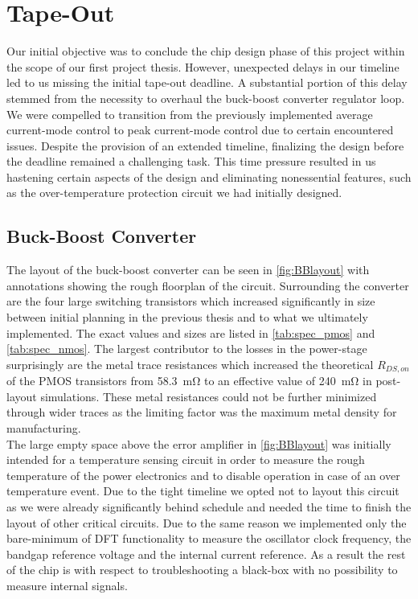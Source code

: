 \section{Tape-Out}
\label{sec:tapout}
Our initial objective was to conclude the chip design phase of this project within the scope of our first project thesis. However, unexpected delays in our timeline led to us missing the initial tape-out deadline. A substantial portion of this delay stemmed from the necessity to overhaul the buck-boost converter regulator loop. We were compelled to transition from the previously implemented average current-mode control to peak current-mode control due to certain encountered issues. Despite the provision of an extended timeline, finalizing the design before the deadline remained a challenging task. This time pressure resulted in us hastening certain aspects of the design and eliminating nonessential features, such as the over-temperature protection circuit we had initially designed.

\subsection{Buck-Boost Converter}
The layout of the buck-boost converter can be seen in  \autoref{fig:BBlayout} with annotations showing the rough floorplan of the circuit. Surrounding the converter are the four large switching transistors which increased significantly in size between initial planning in the previous thesis and to what we ultimately implemented. The exact values and sizes are listed in \autoref{tab:spec_pmos} and \autoref{tab:spec_nmos}. The largest contributor to the losses in the power-stage surprisingly are the metal trace resistances which increased the theoretical $R_{DS,on}$ of the \ac{PMOS} transistors from \qty{58.3}{\milli\ohm} to an effective value of \qty{240}{\milli\ohm} in post-layout simulations. These metal resistances could not be further minimized through wider traces as the limiting factor was the maximum metal density for manufacturing. \\
The large empty space above the error amplifier in \autoref{fig:BBlayout} was initially intended for a temperature sensing circuit in order to measure the rough temperature of the power electronics and to disable operation in case of an over temperature event. Due to the tight timeline we opted not to layout this circuit as we were already significantly behind schedule and needed the time to finish the layout of other critical circuits. Due to the same reason we implemented only the bare-minimum of \ac{DFT} functionality to measure the oscillator clock frequency, the bandgap reference voltage and the internal current reference. As a result the rest of the chip is with respect to troubleshooting a black-box with no possibility to measure internal signals.


